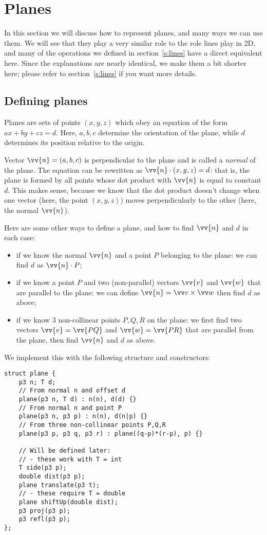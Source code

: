 \section{Planes}
In this section we will discuss how to represent planes, and many ways we can use them. We will see that they play a very similar role to the role lines play in 2D, and many of the operations we defined in section~\ref{s:lines} have a direct equivalent here. Since the explanations are nearly identical, we make them a bit shorter here; please refer to section~\ref{s:lines} if you want more details.

\subsection{Defining planes}
Planes are sets of points $(x,y,z)$ which obey an equation of the form $ax+by+cz=d$. Here, $a,b,c$ determine the orientation of the plane, while $d$ determines its position relative to the origin.


Vector $\vv{n}=(a,b,c)$ is perpendicular to the plane and is called a \emph{normal} of the plane. The equation can be rewritten as $\vv{n}\cdot(x,y,z) = d$: that is, the plane is formed by all points whose dot product with $\vv{n}$ is equal to constant $d$. This makes sense, because we know that the dot product doesn't change when one vector (here, the point $(x,y,z)$) moves perpendicularly to the other (here, the normal $\vv{n}$).


Here are some other ways to define a plane, and how to find $\vv{n}$ and $d$ in each case:
\begin{itemize}
\item if we know the normal $\vv{n}$ and a point $P$ belonging to the plane: we can find $d$ as $\vv{n}\cdot P$;
\item if we know a point $P$ and two (non-parallel) vectors $\vv{v}$ and $\vv{w}$ that are parallel to the plane: we can define $\vv{n}=\crossv{v}{w}$ then find $d$ as above;
\item if we know 3 non-collinear points $P,Q,R$ on the plane: we first find two vectors $\vv{v}=\vv{PQ}$ and $\vv{w} = \vv{PR}$ that are parallel from the plane, then find $\vv{n}$ and $d$ as above.
\end{itemize}

We implement this with the following structure and constructors:
\begin{lstlisting}
struct plane {
    p3 n; T d;
    // From normal n and offset d
    plane(p3 n, T d) : n(n), d(d) {}
    // From normal n and point P
    plane(p3 n, p3 p) : n(n), d(n|p) {}
    // From three non-collinear points P,Q,R
    plane(p3 p, p3 q, p3 r) : plane((q-p)*(r-p), p) {}
    
    // Will be defined later:
    // - these work with T = int
    T side(p3 p);
    double dist(p3 p);
    plane translate(p3 t);
    // - these require T = double
    plane shiftUp(double dist);
    p3 proj(p3 p);
    p3 refl(p3 p);
};
\end{lstlisting}

